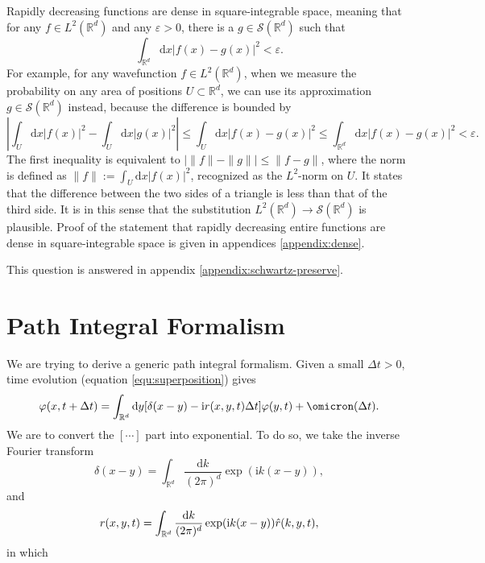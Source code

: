 \documentclass{book}
\newcommand{\assign}{:=}
\newcommand{\mathd}{\mathrm{d}}
\newcommand{\mathi}{\mathrm{i}}
\newcommand{\mathpi}{\pi}
\begin{document}
Rapidly decreasing functions are dense in square-integrable space, meaning
that for any $f \in L^2 (\mathbb{R}^d)$ and any $\varepsilon > 0$, there is a
$g \in \mathcal{S} (\mathbb{R}^d)$ such that
\[ \int_{\mathbb{R}^d} \mathd x |f (x) - g (x) |^2 < \varepsilon . \]
For example, for any wavefunction $f \in L^2 (\mathbb{R}^d)$, when we measure
the probability on any area of positions $U \subset \mathbb{R}^d$, we can use
its approximation $g \in \mathcal{S} (\mathbb{R}^d)$ instead, because the
difference is bounded by
\[ \left| \int_U \mathd x|f (x) |^2 - \int_U \mathd x|g (x) |^2 \right|
   \leqslant \int_U \mathd x |f (x) - g (x) |^2 \leqslant \int_{\mathbb{R}^d}
   \mathd x |f (x) - g (x) |^2 < \varepsilon . \]
The first inequality is equivalent to $|\|f\|-\|g\|| \leqslant \|f - g\|$,
where the norm is defined as $\|f\| \assign \int_U \mathd x |f (x) |^2$,
recognized as the $L^2$-norm on $U$. It states that the difference between the
two sides of a triangle is less than that of the third side. It is in this
sense that the substitution $L^2 (\mathbb{R}^d) \rightarrow \mathcal{S}
(\mathbb{R}^d)$ is plausible. Proof of the statement that rapidly decreasing
entire functions are dense in square-integrable space is given in appendices
\ref{appendix:dense}.

This question is answered in appendix \ref{appendix:schwartz-preserve}.

\section{Path Integral Formalism}\label{section:Path Integral Formalism}

We are trying to derive a generic path integral formalism. Given a small
$\Delta t > 0$, time evolution (equation \ref{equ:superposition}) gives
\[ \varphi (x, t + \Delta t) = \int_{\mathbb{R}^d} \mathd y [\delta (x - y) -
   \mathi {\color[HTML]{000000}r (x, y, t)} \Delta t] \varphi (y, t) +
   \omicron (\Delta t) . \]
We are to convert the $[\cdots]$ part into exponential. To do so, we take the
inverse Fourier transform
\[ \delta (x - y) = \int_{\mathbb{R}^d} \frac{\mathd k}{(2 \mathpi)^d} \exp
   (\mathi k (x - y)), \]
and
\begin{equation}
  {\color[HTML]{000000}r (x, y, t)} = \int_{\mathbb{R}^d} \frac{\mathd k}{(2
  \mathpi)^d} \exp (\mathi k (x - y)) {\color[HTML]{000000}\hat{r}  (k, y,
  t)}, \label{eq:r-fourier}
\end{equation}
in which
\end{document}
